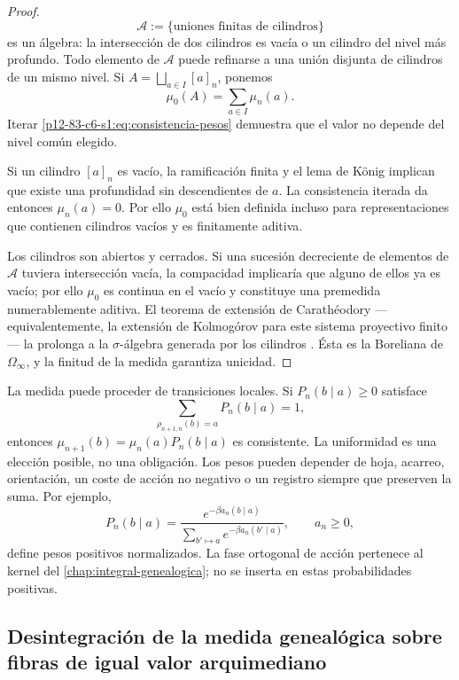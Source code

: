 \begin{proof}
\[
 \mathscr A
 :=\{\text{uniones finitas de cilindros}\}
\]
es un álgebra: la intersección de dos cilindros es vacía o un cilindro del
nivel más profundo. Todo elemento de \(\mathscr A\) puede refinarse a una
unión disjunta de cilindros de un mismo nivel. Si
\(A=\bigsqcup_{a\in I}[a]_n\), ponemos
\[
 \mu_0(A)=\sum_{a\in I}\mu_n(a).
\]
Iterar \eqref{p12-83-c6-s1:eq:consistencia-pesos} demuestra que el valor no depende del
nivel común elegido.

Si un cilindro \([a]_n\) es vacío, la ramificación finita y el lema de König
\cite{Koenig1936}
implican que existe una profundidad sin descendientes de \(a\). La
consistencia iterada da entonces \(\mu_n(a)=0\). Por ello \(\mu_0\) está bien
definida incluso para representaciones que contienen cilindros vacíos y es
finitamente aditiva.

Los cilindros son abiertos y cerrados. Si una sucesión decreciente de
elementos de \(\mathscr A\) tuviera intersección vacía, la compacidad
implicaría que alguno de ellos ya es vacío; por ello \(\mu_0\) es continua en
el vacío y constituye una premedida numerablemente aditiva. El teorema de extensión de
Carathéodory ---equivalentemente, la extensión de Kolmogórov para este sistema
proyectivo finito--- la prolonga a la \(\sigma\)-álgebra generada por los
cilindros \cite{Caratheodory1914,Kolmogorov1933}. Ésta es la Boreliana de
\(\Omega_\infty\), y la finitud de la
medida garantiza unicidad.
\end{proof}

La medida puede proceder de transiciones locales. Si
\(P_n(b\mid a)\ge0\) satisface
\[
 \sum_{\rho_{n+1,n}(b)=a}P_n(b\mid a)=1,
\]
entonces
\(\mu_{n+1}(b)=\mu_n(a)P_n(b\mid a)\) es consistente. La uniformidad es una
elección posible, no una obligación. Los pesos pueden depender de hoja,
acarreo, orientación, un coste de acción no negativo o un registro siempre
que preserven la suma. Por ejemplo,
\[
 P_n(b\mid a)
 =\frac{e^{-\beta a_n(b\mid a)}}
        {\sum_{b'\mapsto a}e^{-\beta a_n(b'\mid a)}},
 \qquad a_n\geq0,
\]
define pesos positivos normalizados. La fase ortogonal de acción pertenece al
kernel del \cref{chap:integral-genealogica}; no se inserta en estas
probabilidades positivas.

\subsection{Desintegración de la medida genealógica sobre fibras de igual valor arquimediano}

